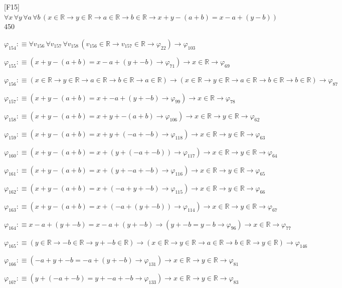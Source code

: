 \begin{fullproof}{[F15]}{$\forall x\,\forall y\,\forall a\,\forall b\,(x \in \mathbb{R} \to y \in \mathbb{R} \to a \in \mathbb{R} \to b \in \mathbb{R} \to x + y - (a + b) = x - a + (y - b))$}{450}
\begin{abbrevlist}
\item $\varphi_{154} :\equiv \forall v_{156}\,\forall v_{157}\,\forall v_{158}\,(v_{156} \in \mathbb{R} \to v_{157} \in \mathbb{R} \to \varphi_{22}) \to \varphi_{103}$
\item $\varphi_{155} :\equiv (x + y - (a + b) = x - a + (y + -b) \to \varphi_{71}) \to x \in \mathbb{R} \to \varphi_{69}$
\item $\varphi_{156} :\equiv (x \in \mathbb{R} \to y \in \mathbb{R} \to a \in \mathbb{R} \to b \in \mathbb{R} \to a \in \mathbb{R}) \to (x \in \mathbb{R} \to y \in \mathbb{R} \to a \in \mathbb{R} \to b \in \mathbb{R} \to b \in \mathbb{R}) \to \varphi_{87}$
\item $\varphi_{157} :\equiv (x + y - (a + b) = x + -a + (y + -b) \to \varphi_{99}) \to x \in \mathbb{R} \to \varphi_{78}$
\item $\varphi_{158} :\equiv (x + y - (a + b) = x + y + -(a + b) \to \varphi_{106}) \to x \in \mathbb{R} \to y \in \mathbb{R} \to \varphi_{62}$
\item $\varphi_{159} :\equiv (x + y - (a + b) = x + y + (-a + -b) \to \varphi_{118}) \to x \in \mathbb{R} \to y \in \mathbb{R} \to \varphi_{63}$
\item $\varphi_{160} :\equiv (x + y - (a + b) = x + (y + (-a + -b)) \to \varphi_{117}) \to x \in \mathbb{R} \to y \in \mathbb{R} \to \varphi_{64}$
\item $\varphi_{161} :\equiv (x + y - (a + b) = x + (y + -a + -b) \to \varphi_{116}) \to x \in \mathbb{R} \to y \in \mathbb{R} \to \varphi_{65}$
\item $\varphi_{162} :\equiv (x + y - (a + b) = x + (-a + y + -b) \to \varphi_{115}) \to x \in \mathbb{R} \to y \in \mathbb{R} \to \varphi_{66}$
\item $\varphi_{163} :\equiv (x + y - (a + b) = x + (-a + (y + -b)) \to \varphi_{114}) \to x \in \mathbb{R} \to y \in \mathbb{R} \to \varphi_{67}$
\item $\varphi_{164} :\equiv x - a + (y + -b) = x - a + (y + -b) \to (y + -b = y - b \to \varphi_{96}) \to x \in \mathbb{R} \to \varphi_{77}$
\item $\varphi_{165} :\equiv (y \in \mathbb{R} \to -b \in \mathbb{R} \to y + -b \in \mathbb{R}) \to (x \in \mathbb{R} \to y \in \mathbb{R} \to a \in \mathbb{R} \to b \in \mathbb{R} \to y \in \mathbb{R}) \to \varphi_{146}$
\item $\varphi_{166} :\equiv (-a + y + -b = -a + (y + -b) \to \varphi_{131}) \to x \in \mathbb{R} \to y \in \mathbb{R} \to \varphi_{81}$
\item $\varphi_{167} :\equiv (y + (-a + -b) = y + -a + -b \to \varphi_{133}) \to x \in \mathbb{R} \to y \in \mathbb{R} \to \varphi_{83}$

\end{abbrevlist}
\end{fullproof}
